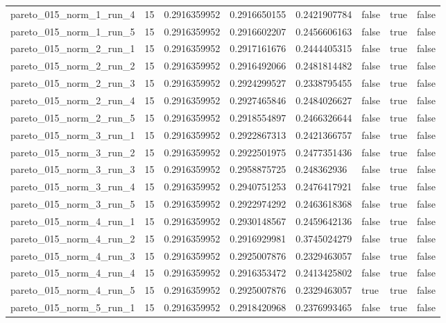 \begin{tabular}{@{}llllllll@{}}
pareto\_015\_norm\_1\_run\_4 & 15 & 0.2916359952 & 0.2916650155 & 0.2421907784 & false & true & false \\
pareto\_015\_norm\_1\_run\_5 & 15 & 0.2916359952 & 0.2916602207 & 0.2456606163 & false & true & false \\
pareto\_015\_norm\_2\_run\_1 & 15 & 0.2916359952 & 0.2917161676 & 0.2444405315 & false & true & false \\
pareto\_015\_norm\_2\_run\_2 & 15 & 0.2916359952 & 0.2916492066 & 0.2481814482 & false & true & false \\
pareto\_015\_norm\_2\_run\_3 & 15 & 0.2916359952 & 0.2924299527 & 0.2338795455 & false & true & false \\
pareto\_015\_norm\_2\_run\_4 & 15 & 0.2916359952 & 0.2927465846 & 0.2484026627 & false & true & false \\
pareto\_015\_norm\_2\_run\_5 & 15 & 0.2916359952 & 0.2918554897 & 0.2466326644 & false & true & false \\
pareto\_015\_norm\_3\_run\_1 & 15 & 0.2916359952 & 0.2922867313 & 0.2421366757 & false & true & false \\
pareto\_015\_norm\_3\_run\_2 & 15 & 0.2916359952 & 0.2922501975 & 0.2477351436 & false & true & false \\
pareto\_015\_norm\_3\_run\_3 & 15 & 0.2916359952 & 0.2958875725 & 0.248362936 & false & true & false \\
pareto\_015\_norm\_3\_run\_4 & 15 & 0.2916359952 & 0.2940751253 & 0.2476417921 & false & true & false \\
pareto\_015\_norm\_3\_run\_5 & 15 & 0.2916359952 & 0.2922974292 & 0.2463618368 & false & true & false \\
pareto\_015\_norm\_4\_run\_1 & 15 & 0.2916359952 & 0.2930148567 & 0.2459642136 & false & true & false \\
pareto\_015\_norm\_4\_run\_2 & 15 & 0.2916359952 & 0.2916929981 & 0.3745024279 & false & true & false \\
pareto\_015\_norm\_4\_run\_3 & 15 & 0.2916359952 & 0.2925007876 & 0.2329463057 & false & true & false \\
pareto\_015\_norm\_4\_run\_4 & 15 & 0.2916359952 & 0.2916353472 & 0.2413425802 & false & true & false \\
pareto\_015\_norm\_4\_run\_5 & 15 & 0.2916359952 & 0.2925007876 & 0.2329463057 & true & true & false \\
pareto\_015\_norm\_5\_run\_1 & 15 & 0.2916359952 & 0.2918420968 & 0.2376993465 & false & true & false \\

\end{tabular}
